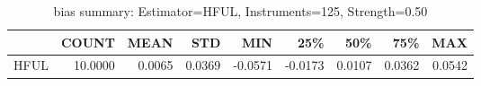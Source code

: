 \begin{table}[ht]
\centering
\caption{bias summary: Estimator=HFUL, Instruments=125, Strength=0.50}
\begin{tabular}{lrrrrrrrr}
\toprule
 & COUNT & MEAN & STD & MIN & 25\% & 50\% & 75\% & MAX \\
\midrule
HFUL & 10.0000 & 0.0065 & 0.0369 & -0.0571 & -0.0173 & 0.0107 & 0.0362 & 0.0542 \\
\bottomrule
\end{tabular}
\end{table}
